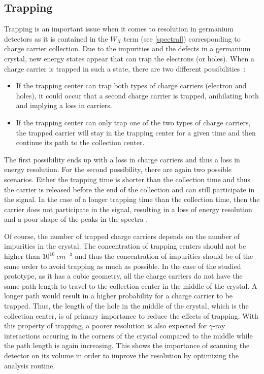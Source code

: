 \documentclass[11pt,a4paper]{article}
\begin{document}
\subsection{Trapping}

Trapping is an important issue when it comes to resolution in germanium detectors as it is contained in the $W_X$ term (see \ref{spectral}) corresponding to charge carrier collection. Due to the impurities and the defects in a germanium crystal, new energy states appear that can trap the electrons (or holes). When a charge carrier is trapped in such a state, there are two different possibilities~:

\begin{itemize}
\item If the trapping center can trap both types of charge carriers (electron and holes), it could occur that a second charge carrier is trapped, anihilating both and implying a loss in carriers.
\item If the trapping center can only trap one of the two types of charge carriers, the trapped carrier will stay in the trapping center for a given time and then continue its path to the collection center.
\end{itemize}
The first possibility ends up with a loss in charge carriers and thus a loss in energy resolution. For the second possibility, there are again two possible scenarios. Either the trapping time is shorter than the collection time and thus the carrier is released before the end of the collection and can still participate in the signal. In the case of a longer trapping time than the collection time, then the carrier does not participate in the signal, resulting in a loss of energy resolution and a poor shape of the peaks in the spectra \cite{Tsoulfanidis}.

Of course, the number of trapped charge carriers depends on the number of impurities in the crystal. The concentration of trapping centers should not be higher than $10^{10}~cm^{-3}$ \cite{ortec} and thus the concentration of impurities should be of the same order to avoid trapping as much as possible. In the case of the studied prototype, as it has a cubic geometry, all the charge carriers do not have the same path length to travel to the collection center in the middle of the crystal. A longer path would result in a higher probability for a charge carrier to be trapped. Thus, the length of the hole in the middle of the crystal, which is the collection center, is of primary importance to reduce the effects of trapping. With this property of trapping, a poorer resolution is also expected for $\gamma$-ray interactions occuring in the corners of the crystal compared to the middle while the path length is again increasing. This shows the importance of scanning the detector on its volume in order to improve the resolution by optimizing the analysis routine.
\end{document}
